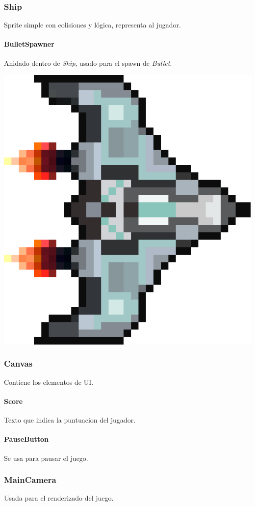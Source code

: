 \documentclass[journal]{IEEEtran}
\newenvironment{Figure}
  {\par\medskip\noindent\minipage{\linewidth}}
  {\endminipage\par\medskip}
\begin{document}
\begin{multicols}{2}
  \subsubsection*{Ship}
  Sprite simple con colisiones y lógica, representa al jugador.

  \medskip
  \paragraph*{BulletSpawner}
  Anidado dentro de \textit{Ship}, usado para el spawn de \textit{Bullet}.

  \vfill\null
  \columnbreak

  \begin{Figure}
    \centering
    \includegraphics[width=0.4\linewidth]{../Assets/Sprites/Ship.png}
    \label{fig:ShipSprite}
  \end{Figure}
  \vfill\null
\end{multicols}


\subsubsection*{Canvas}
Contiene los elementos de UI.
\paragraph*{Score}
Texto que indica la puntuacion del jugador.
\paragraph*{PauseButton}
Se usa para pausar el juego.

\medskip
\subsubsection*{MainCamera}
Usada para el renderizado del juego.
\end{document}
